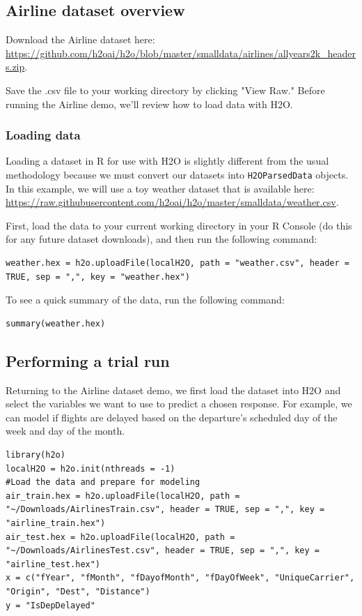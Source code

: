 \subsection{Airline dataset overview} 

Download the Airline dataset here: {\url{https://github.com/h2oai/h2o/blob/master/smalldata/airlines/allyears2k_headers.zip}}.

Save the .csv file to your working directory by clicking  "View Raw."  Before running the Airline demo, we'll review how to load data with H2O. 

\subsubsection{Loading data} \label{2.5}

Loading a dataset in R for use with H2O is slightly different from the usual methodology because we must convert our datasets into \texttt{H2OParsedData} objects. In this example, we will use a toy weather dataset that is available here: {\url{https://raw.githubusercontent.com/h2oai/h2o/master/smalldata/weather.csv}}. 

First, load the data to your current working directory in your R Console (do this for any future dataset downloads), and then run the following command:
\begin{lstlisting}[style=R]
weather.hex = h2o.uploadFile(localH2O, path = "weather.csv", header = TRUE, sep = ",", key = "weather.hex")
\end{lstlisting}
\bigskip

To see a quick summary of the data, run the following command:
\begin{lstlisting}[style=R]
summary(weather.hex)
\end{lstlisting}

\subsection{Performing a trial run} \label{3.2}
Returning to the Airline dataset demo, we first load the dataset into H2O and select the variables we want to use to predict a chosen response. For example, we can model if flights are delayed based on the departure's scheduled day of the week and day of the month.

\begin{lstlisting}[style=R]
library(h2o)
localH2O = h2o.init(nthreads = -1)
#Load the data and prepare for modeling
air_train.hex = h2o.uploadFile(localH2O, path = "~/Downloads/AirlinesTrain.csv", header = TRUE, sep = ",", key = "airline_train.hex")
air_test.hex = h2o.uploadFile(localH2O, path = "~/Downloads/AirlinesTest.csv", header = TRUE, sep = ",", key = "airline_test.hex")
x = c("fYear", "fMonth", "fDayofMonth", "fDayOfWeek", "UniqueCarrier", "Origin", "Dest", "Distance")
y = "IsDepDelayed"
\end{lstlisting}

